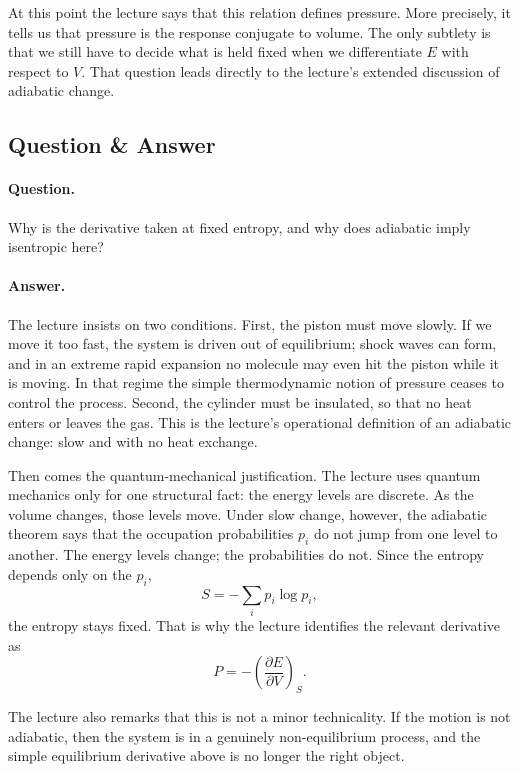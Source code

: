 At this point the lecture says that this relation defines pressure. More precisely, it tells us that pressure is the response conjugate to volume. The only subtlety is that we still have to decide what is held fixed when we differentiate \(E\) with respect to \(V\). That question leads directly to the lecture's extended discussion of adiabatic change.

\subsection{Question \& Answer}

\paragraph{Question.} Why is the derivative taken at fixed entropy, and why does adiabatic imply isentropic here?

\paragraph{Answer.} The lecture insists on two conditions. First, the piston must move slowly. If we move it too fast, the system is driven out of equilibrium; shock waves can form, and in an extreme rapid expansion no molecule may even hit the piston while it is moving. In that regime the simple thermodynamic notion of pressure ceases to control the process. Second, the cylinder must be insulated, so that no heat enters or leaves the gas. This is the lecture's operational definition of an adiabatic change: slow and with no heat exchange.

Then comes the quantum-mechanical justification. The lecture uses quantum mechanics only for one structural fact: the energy levels are discrete. As the volume changes, those levels move. Under slow change, however, the adiabatic theorem says that the occupation probabilities \(p_i\) do not jump from one level to another. The energy levels change; the probabilities do not. Since the entropy depends only on the \(p_i\),
\begin{equation}
S=-\sum_i p_i\log p_i,
\end{equation}
the entropy stays fixed. That is why the lecture identifies the relevant derivative as
\begin{equation}
P=-\left(\frac{\partial E}{\partial V}\right)_S.
\end{equation}

The lecture also remarks that this is not a minor technicality. If the motion is not adiabatic, then the system is in a genuinely non-equilibrium process, and the simple equilibrium derivative above is no longer the right object.

